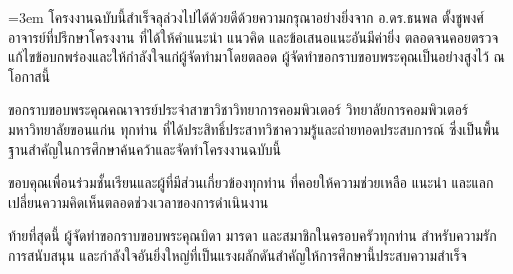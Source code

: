 %

\emergencystretch=3em
โครงงานฉบับนี้สำเร็จลุล่วงไปได้ด้วยดีด้วยความกรุณาอย่างยิ่งจาก อ.ดร.ธนพล ตั้งชูพงศ์ อาจารย์ที่ปรึกษาโครงงาน ที่ได้ให้คำแนะนำ แนวคิด และข้อเสนอแนะอันมีค่ายิ่ง ตลอดจนคอยตรวจแก้ไขข้อบกพร่องและให้กำลังใจแก่ผู้จัดทำมาโดยตลอด ผู้จัดทำขอกราบขอบพระคุณเป็นอย่างสูงไว้ ณ โอกาสนี้

ขอกราบขอบพระคุณคณาจารย์ประจำสาขาวิชาวิทยาการคอมพิวเตอร์ วิทยาลัยการคอมพิวเตอร์ มหาวิทยาลัยขอนแก่น ทุกท่าน ที่ได้ประสิทธิ์ประสาทวิชาความรู้และถ่ายทอดประสบการณ์ ซึ่งเป็นพื้นฐานสำคัญในการศึกษาค้นคว้าและจัดทำโครงงานฉบับนี้

ขอบคุณเพื่อนร่วมชั้นเรียนและผู้ที่มีส่วนเกี่ยวข้องทุกท่าน ที่คอยให้ความช่วยเหลือ แนะนำ และแลกเปลี่ยนความคิดเห็นตลอดช่วงเวลาของการดำเนินงาน

ท้ายที่สุดนี้ ผู้จัดทำขอกราบขอบพระคุณบิดา มารดา และสมาชิกในครอบครัวทุกท่าน สำหรับความรัก การสนับสนุน และกำลังใจอันยิ่งใหญ่ที่เป็นแรงผลักดันสำคัญให้การศึกษานี้ประสบความสำเร็จ

